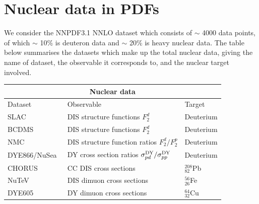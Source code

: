 \section{Nuclear data in PDFs}
\label{sec:nucdat}
We consider the NNPDF3.1 NNLO dataset which consists of $\sim$ 4000 data points, of which $\sim$ 10\% is deuteron data and $\sim$ 20\% is heavy nuclear data. The table below summarises the datasets which make up the total nuclear data, giving the name of dataset, the observable it corresponds to, and the nuclear target involved.
\begin{center}
\begin{tabular}{ |p{4cm}|p{7cm}|p{2cm}|  }
\hline
\multicolumn{3}{|c|}{Nuclear data} \\
\hline
Dataset & Observable & Target \\
\hline
\rowcolor{blue!20}
SLAC~\cite{Whitlow:1991uw}& DIS structure functions $F_2^d$ & Deuterium  \\
\rowcolor{blue!20}
BCDMS~\cite{Benvenuti:1989fm} & DIS structure functions $F_2^d$ & Deuterium \\
\rowcolor{blue!20}
NMC~\cite{Arneodo:1996kd} & DIS structure function ratios $F_2^d/F_2^p$ & Deuterium \\
\rowcolor{blue!20}
DYE866/NuSea~\cite{Towell:2001nh} & DY cross section ratios $\sigma^{\rm DY}_{pd}/\sigma^{\rm DY}_{pp}$ & Deuterium \\
\hline
\rowcolor{blue!40}
CHORUS~\cite{Onengut:2005kv} & CC DIS cross sections & $^{208}_{82}$Pb  \\
\rowcolor{blue!40}
NuTeV~\cite{Tzanov:2005kr} & DIS dimuon cross sections & $^{56}_{26}$Fe  \\
\rowcolor{blue!40}
DYE605~\cite{Heinrich:1989cp} & DY dimuon cross sections & $^{64}_{32}$Cu  \\
\hline
\end{tabular}
\end{center}
